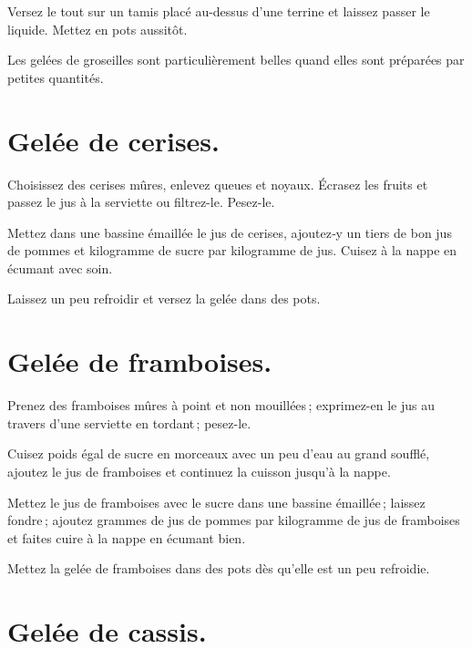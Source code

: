 Versez le tout sur un tamis placé au-dessus d'une terrine et laissez passer
le liquide. Mettez en pots aussitôt.

\medskip

Les gelées de groseilles sont particulièrement belles quand elles sont préparées
par petites quantités.

\section*{\centering Gelée de cerises.}
{}

Choisissez des cerises mûres, enlevez queues et noyaux. Écrasez les fruits et
passez le jus à la serviette ou filtrez-le. Pesez-le.

Mettez dans une bassine émaillée le jus de cerises, ajoutez‑y un tiers de bon
jus de pommes et {\mmm} kilogramme de sucre par kilogramme de jus. Cuisez
à la nappe en écumant avec soin.

Laissez un peu refroidir et versez la gelée dans des pots.

\section*{\centering Gelée de framboises.}
{}

Prenez des framboises mûres à point et non mouillées ; exprimez-en le jus
au travers d'une serviette en tordant ; pesez-le.

Cuisez poids égal de sucre en morceaux avec un peu d'eau au grand soufflé,
ajoutez le jus de framboises et continuez la cuisson jusqu'à la nappe.

\sk

Mettez le jus de framboises avec le sucre dans une bassine émaillée ; laissez
fondre ; ajoutez {\mmm} grammes de jus de pommes par kilogramme de jus
de framboises et faites cuire à la nappe en écumant bien.

Mettez la gelée de framboises dans des pots dès qu'elle est un peu refroidie.

\section*{\centering Gelée de cassis.}
{}

